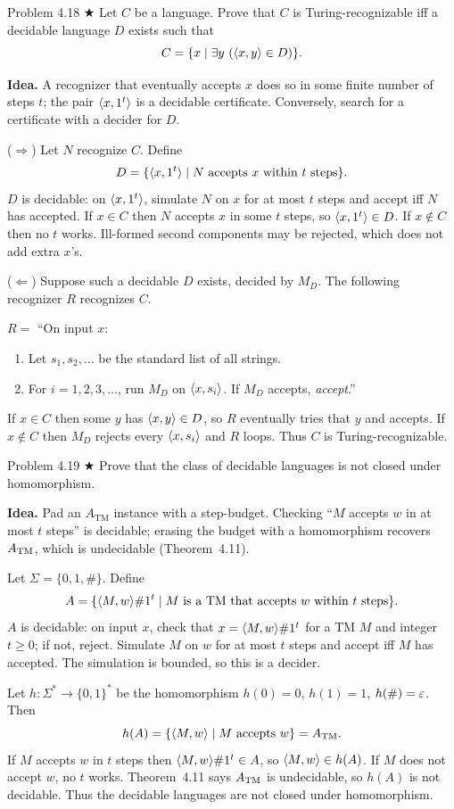 \begin{question}{Problem 4.18 $\bigstar$}
Let $C$ be a language. Prove that $C$ is Turing-recognizable iff a decidable language $D$ exists such that
\[
C=\{x\mid \exists y\ (\enc{x,y}\in D)\}.
\]
\end{question}
\begin{soln}
\textbf{Idea.} A recognizer that eventually accepts $x$ does so in some finite number of steps $t$; the pair $\langle x,1^t\rangle$ is a decidable certificate. Conversely, search for a certificate with a decider for $D$.

($\Rightarrow$) Let $N$ recognize $C$. Define
\[
D=\{\langle x,1^t\rangle\mid N\text{ accepts }x\text{ within }t\text{ steps}\}.
\]
$D$ is decidable: on $\langle x,1^t\rangle$, simulate $N$ on $x$ for at most $t$ steps and accept iff $N$ has accepted. If $x\in C$ then $N$ accepts $x$ in some $t$ steps, so $\langle x,1^t\rangle\in D$. If $x\notin C$ then no $t$ works. Ill-formed second components may be rejected, which does not add extra $x$'s.

($\Leftarrow$) Suppose such a decidable $D$ exists, decided by $M_D$. The following recognizer $R$ recognizes $C$.

$R=$ ``On input $x$:
\begin{enumerate}
\item Let $s_1,s_2,\dots$ be the standard list of all strings.
\item For $i=1,2,3,\dots$, run $M_D$ on $\langle x,s_i\rangle$. If $M_D$ accepts, \emph{accept}.''
\end{enumerate}
If $x\in C$ then some $y$ has $\langle x,y\rangle\in D$, so $R$ eventually tries that $y$ and accepts. If $x\notin C$ then $M_D$ rejects every $\langle x,s_i\rangle$ and $R$ loops. Thus $C$ is Turing-recognizable.
\end{soln}

\begin{question}{Problem 4.19 $\bigstar$}
Prove that the class of decidable languages is not closed under homomorphism.
\end{question}
\begin{soln}
\textbf{Idea.} Pad an $A_{\mathrm{TM}}$ instance with a step-budget. Checking ``$M$ accepts $w$ in at most $t$ steps'' is decidable; erasing the budget with a homomorphism recovers $A_{\mathrm{TM}}$, which is undecidable (Theorem~4.11).

Let $\Sigma=\{0,1,\#\}$. Define
\[
A=\{\langle M,w\rangle\#1^t \mid M\text{ is a TM that accepts }w\text{ within }t\text{ steps}\}.
\]
$A$ is decidable: on input $x$, check that $x=\langle M,w\rangle\#1^t$ for a TM $M$ and integer $t\ge 0$; if not, reject. Simulate $M$ on $w$ for at most $t$ steps and accept iff $M$ has accepted. The simulation is bounded, so this is a decider.

Let $h\colon\Sigma^*\to\{0,1\}^*$ be the homomorphism $h(0)=0$, $h(1)=1$, $h(\#)=\varepsilon$. Then
\[
h(A)=\{\langle M,w\rangle\mid M\text{ accepts }w\}=A_{\mathrm{TM}}.
\]
If $M$ accepts $w$ in $t$ steps then $\langle M,w\rangle\#1^t\in A$, so $\langle M,w\rangle\in h(A)$. If $M$ does not accept $w$, no $t$ works. Theorem~4.11 says $A_{\mathrm{TM}}$ is undecidable, so $h(A)$ is not decidable. Thus the decidable languages are not closed under homomorphism.
\end{soln}

